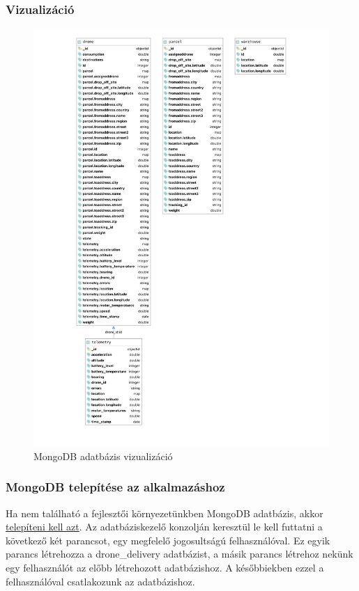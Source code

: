 \subsubsection{Vizualizáció}

\begin{figure}[hbt!]
    \centering
    \includegraphics[scale=0.7]{images/mongo.pdf}
    \caption{MongoDB adatbázis vizualizáció}
    \label{fig:mongodb}
\end{figure}

\subsubsection{MongoDB telepítése az alkalmazáshoz}\label{subsubsec:mongodb-telepítése-az-alkalmazáshoz}
Ha nem található a fejlesztői környezetünkben MongoDB adatbázis, akkor \href{https://www.mongodb.com/try/download/community}{telepíteni kell azt}.
Az adatbáziskezelő konzolján keresztül le kell futtatni a következő két parancsot, egy megfelelő jogosultságú felhasználóval.
Ez egyik parancs létrehozza a drone\_delivery adatbázist, a másik parancs létrehoz nekünk egy felhasználót az előbb létrehozott adatbázishoz.
A későbbiekben ezzel a felhasználóval csatlakozunk az adatbázishoz.


